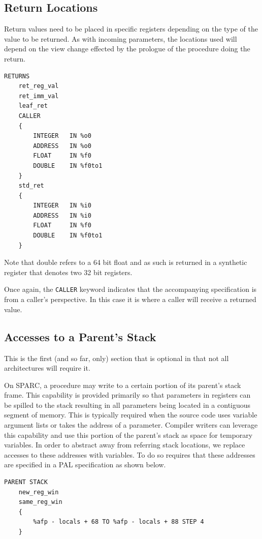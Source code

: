 \subsection{Return Locations}

Return values need to be placed in specific registers depending on
the type of the value to be returned. As with incoming parameters,
the locations used will depend on the view change effected by the
prologue of the procedure doing the return.

\begin{verbatim}
RETURNS
    ret_reg_val
    ret_imm_val
    leaf_ret
    CALLER
    {
        INTEGER   IN %o0
        ADDRESS   IN %o0
        FLOAT     IN %f0
        DOUBLE    IN %f0to1
    }
    std_ret
    {
        INTEGER   IN %i0
        ADDRESS   IN %i0
        FLOAT     IN %f0
        DOUBLE    IN %f0to1
    }
\end{verbatim}

Note that double refers to a 64 bit float and as such is returned in
a synthetic register that denotes two 32 bit registers.

Once again, the {\tt CALLER} keyword indicates that the accompanying
specification is from a caller's perspective. In this case it is
where a caller will receive a returned value.

\subsection{Accesses to a Parent's Stack}

This is the first (and so far, only) section that is optional in
that not all architectures will require it.

On SPARC, a procedure may write to a certain portion of its parent's
stack frame. This capability is provided primarily so that parameters
in registers can be spilled to the stack resulting in all parameters
being located in a contiguous segment of memory. This is typically
required when the source code uses variable argument lists or
takes the address of a parameter. Compiler writers can leverage
this capability and use this portion of the parent's stack as
space for temporary variables. In order to abstract away from
referring stack locations, we replace accesses to these addresses
with variables. To do so requires that these addresses are specified
in a PAL specification as shown below.

\begin{verbatim}
PARENT STACK
    new_reg_win
    same_reg_win
    {
        %afp - locals + 68 TO %afp - locals + 88 STEP 4
    }
\end{verbatim}


